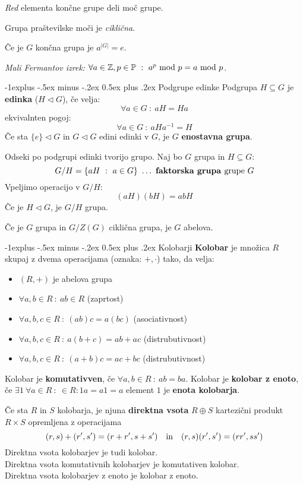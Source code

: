 \documentclass[a4paper,9pt]{extarticle}
\makeatletter
\renewcommand{\subsection}{\@startsection{subsection}{2}{0mm}%
                                {-1explus -.5ex minus -.2ex}%
                                {0.5ex plus .2ex}%
                                {\normalfont\normalsize\bfseries}}
\makeatother
\begin{document}
\begin{multicols}{3}
\emph{Red} elementa končne grupe deli moč grupe.

Grupa praštevilske moči je \emph{ciklična}.

Če je $G$ končna grupa je $a^{|G|} = e$.

\emph{Mali Fermantov izrek:} $\forall a \in \mathbb{Z}, p \in \mathbb{P}\ :\ a^p \textmd{ mod } p = a \textmd{ mod } p$.

\subsection{Podgrupe edinke}
Podgrupa $H \subseteq G$ je \textbf{edinka} ($H \lhd G$), če velja:
\[\forall a \in G\ :\ aH = Ha\]
ekvivalnten pogoj:
\[\forall a \in G\ :\ aHa^{-1} = H\]
Če sta $\{e\} \lhd G$ in $G \lhd G$ edini edinki v $G$, je $G$ \textbf{enostavna grupa}.

Odseki po podgrupi edinki tvorijo grupo. Naj bo $G$ grupa in $H\subseteq G$:
\[G/H = \left\{ aH\ :\ a \in G \right\}\ \dots\ \textbf{faktorska grupa }\textmd{grupe }G\]
Vpeljimo operacijo v $G/H$:
\[(aH)(bH) = abH\]
Če je $H \lhd G$, je $G/H$ grupa.

Če je $G$ grupa in $G/Z(G)$ ciklična grupa, je $G$ abelova.

\subsection{Kolobarji}
\textbf{Kolobar} je množica $R$ skupaj z dvema operacijama (oznaka: $+, \cdot$) tako, da velja:
\begin{itemize}
    \item $(R, +)$ je abelova grupa
    \item $\forall a, b \in R\ :\ ab \in R$ (zaprtost)
    \item $\forall a, b, c \in R\ :\ (ab)c = a(bc)$ (asociativnost)
    \item $\forall a, b, c \in R\ :\ a(b+c) = ab + ac$ (distrubutivnost)
    \item $\forall a, b, c \in R\ :\ (a+b)c = ac + bc$ (distrubutivnost)
\end{itemize}
Kolobar je \textbf{komutativven}, če $\forall a, b \in R\ :\ ab = ba$.
Kolobar je \textbf{kolobar z enoto}, če $\exists 1\ \forall a \in R\ :\ \in R : 1a = a1 = a$ element $1$ je \textbf{enota kolobarja}.

Če sta $R$ in $S$ kolobarja, je njuna \textbf{direktna vsota} $R \oplus S$ kartezični produkt $R \times S$ opremljena z operacijama
\[(r,s) + (r',s') = (r+r',s+s') \quad \textmd{in} \quad (r,s)(r',s') = (rr',ss')\]
Direktna vsota kolobarjev je tudi kolobar. \\
Direktna vsota komutativnih kolobarjev je komutativen kolobar.\\
Direktna vsota kolobarjev z enoto je kolobar z enoto.\\\


\end{multicols}
\end{document}
